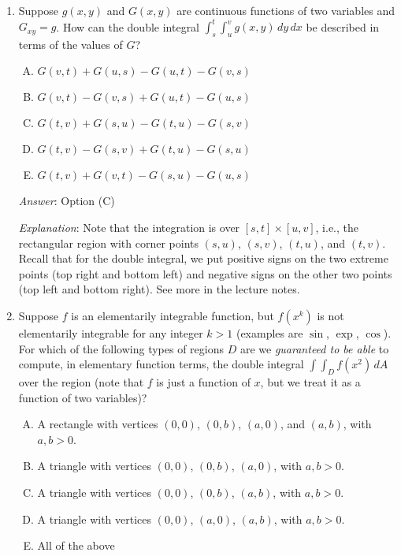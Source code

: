 \documentclass[10pt]{amsart}
\begin{document}
\begin{enumerate}
  {\em Answer}: Option (C)

  {\em Explanation}: Each monomial is of the form a constant times
  $x^py^q$ where $p + q = d$. Integrating this as a multiplicatively
  separable function gives $x^{p+1}y^{q+1}$ times a
  constant. Evaluating between limits gives $a^{d + 2}$ times a
  constant. This is the form of the double integral of each monomial,
  and hence the double integral of the sum is also of the same form.

\item Suppose $g(x,y)$ and $G(x,y)$ are continuous functions of two
  variables and $G_{xy} = g$. How can the double integral $\int_s^t
  \int_u^v g(x,y) \, dy \, dx$ be described in terms of the values of
  $G$?

  \begin{enumerate}[(A)]
  \item $G(v,t) + G(u,s) - G(u,t) - G(v,s)$
  \item $G(v,t) - G(v,s) + G(u,t) - G(u,s)$
  \item $G(t,v) + G(s,u) - G(t,u) - G(s,v)$
  \item $G(t,v) - G(s,v) + G(t,u) - G(s,u)$
  \item $G(t,v) + G(v,t) - G(s,u) - G(u,s)$
  \end{enumerate}

  {\em Answer}: Option (C)

  {\em Explanation}: Note that the integration is over $[s,t] \times
  [u,v]$, i.e., the rectangular region with corner points $(s,u)$,
  $(s,v)$, $(t,u)$, and $(t,v)$. Recall that for the double integral,
  we put positive signs on the two extreme points (top right and
  bottom left) and negative signs on the other two points (top left
  and bottom right). See more in the lecture notes.

\item Suppose $f$ is an elementarily integrable function, but $f(x^k)$
  is not elementarily integrable for any integer $k > 1$ (examples are
  $\sin$, $\exp$, $\cos$). For which of the following types of regions
  $D$ are we {\em guaranteed to be able} to compute, in elementary
  function terms, the double integral $\int \int_D f(x^2) \, dA$ over
  the region (note that $f$ is just a function of $x$, but we treat it
  as a function of two variables)?

  \begin{enumerate}[(A)]
  \item A rectangle with vertices $(0,0)$, $(0,b)$, $(a,0)$, and
    $(a,b)$, with $a,b > 0$.
  \item A triangle with vertices $(0,0)$, $(0,b)$, $(a,0)$, with $a, b
    > 0$.
  \item A triangle with vertices $(0,0)$, $(0,b)$, $(a,b)$, with $a, b
    > 0$.
  \item A triangle with vertices $(0,0)$, $(a,0)$, $(a,b)$, with $a, b
    > 0$.
  \item All of the above
  \end{enumerate}


\end{enumerate}
\end{document}

